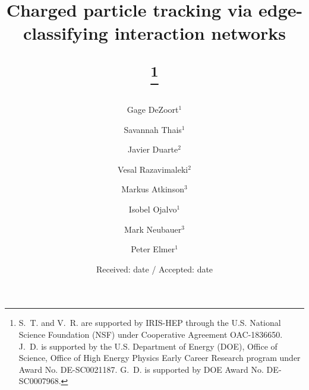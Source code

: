 \documentclass[twocolumn]{svjour3}
\begin{document}
\title{Charged particle tracking via edge-classifying interaction networks

\thanks{S.~T. and V.~R. are supported by IRIS-HEP through the U.S. National Science Foundation (NSF) under Cooperative Agreement OAC-1836650.
J.~D. is supported by the U.S. Department of Energy (DOE), Office of Science, Office of High Energy Physics Early Career Research program under Award No. DE-SC0021187.
G.~D. is supported by DOE Award No. DE‐SC0007968.}
}

\author{Gage DeZoort$^{1}$ \and
Savannah Thais$^{1}$ \and
Javier Duarte$^{2}$\and
Vesal Razavimaleki$^{2}$ \and
Markus Atkinson$^{3}$ \and
Isobel Ojalvo$^{1}$ \and
Mark Neubauer$^{3}$ \and
Peter Elmer$^{1}$
}




\date{Received: date / Accepted: date}

\maketitle
\end{document}
